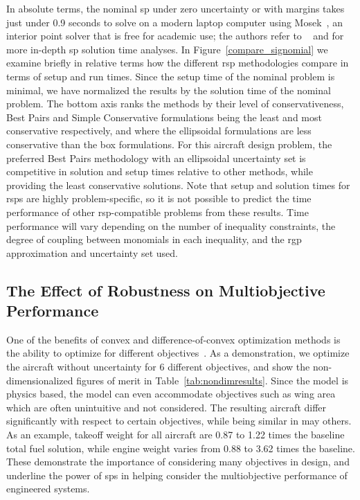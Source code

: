 In absolute
terms, the nominal \gls{sp} under zero uncertainty or with margins
takes just under 0.9 seconds to solve on a modern laptop computer using Mosek~\cite{mosek},
an interior point solver that is free for academic use; the authors
refer to ~\cite{Kirschen2018Log} and \cite{York2018} for more in-depth \gls{sp} solution time analyses.
In Figure~\ref{compare_signomial} we examine briefly in relative terms
how the different \gls{rsp} methodologies compare in terms of setup and
run times. Since the setup time of the nominal problem is minimal,
we have normalized the results by the solution time of the nominal problem.
The bottom axis ranks the methods by their level of conservativeness, Best Pairs
and Simple Conservative formulations being the least and most conservative respectively,
and where the ellipsoidal formulations are less conservative than the box formulations.
For this aircraft design problem, the preferred Best Pairs methodology
with an ellipsoidal uncertainty set
is competitive in solution and setup times relative to other methods, while providing
the least conservative solutions.
Note that setup and solution times for \gls{rsp}s are highly problem-specific, so it is not possible
to predict the time performance of other \gls{rsp}-compatible problems from these results.
Time performance will vary depending on the number of inequality constraints,
the degree of coupling between monomials
in each inequality, and the \gls{rgp} approximation and uncertainty set used.

\subsection{The Effect of Robustness on Multiobjective Performance}

One of the benefits of convex and difference-of-convex optimization methods is the ability to optimize for
different objectives~\cite{York2018}. As a demonstration, we optimize the aircraft without uncertainty
for 6 different objectives, and show
the non-dimensionalized figures of merit in Table~\ref{tab:nondimresults}.
Since the model is physics based, the model can even accommodate objectives such as wing area
which are often unintuitive and not considered. The resulting aircraft
differ significantly with respect to certain objectives, while being similar in may others.
As an example, takeoff weight for all aircraft are 0.87 to 1.22 times the baseline total fuel solution,
while engine weight varies from 0.88 to 3.62 times the baseline.
These demonstrate the importance of considering many objectives
in design, and underline the power of \gls{sp}s in helping
consider the multiobjective performance of engineered systems.

